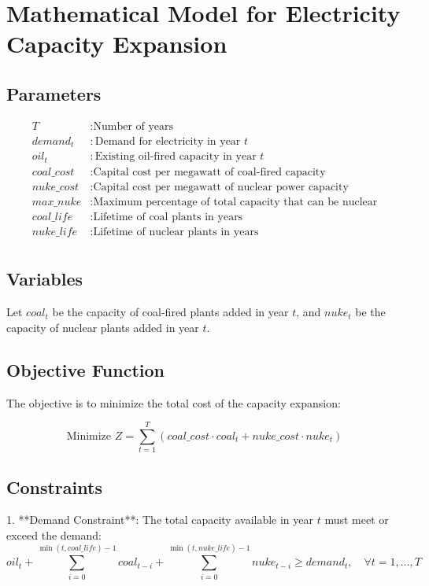 \documentclass{article}
\begin{document}
\section*{Mathematical Model for Electricity Capacity Expansion}

\subsection*{Parameters}

\begin{align*}
T & : \text{Number of years} \\
demand_t & : \text{Demand for electricity in year } t \\
oil_t & : \text{Existing oil-fired capacity in year } t \\
coal\_cost & : \text{Capital cost per megawatt of coal-fired capacity} \\
nuke\_cost & : \text{Capital cost per megawatt of nuclear power capacity} \\
max\_nuke & : \text{Maximum percentage of total capacity that can be nuclear} \\
coal\_life & : \text{Lifetime of coal plants in years} \\
nuke\_life & : \text{Lifetime of nuclear plants in years} \\
\end{align*}

\subsection*{Variables}

Let \( coal_t \) be the capacity of coal-fired plants added in year \( t \), and \( nuke_t \) be the capacity of nuclear plants added in year \( t \).

\subsection*{Objective Function}

The objective is to minimize the total cost of the capacity expansion:

\[
\text{Minimize } Z = \sum_{t=1}^{T} (coal\_cost \cdot coal_t + nuke\_cost \cdot nuke_t)
\]

\subsection*{Constraints}

1. **Demand Constraint**:
   The total capacity available in year \( t \) must meet or exceed the demand:
   \[
   oil_t + \sum_{i=0}^{\min(t, coal\_life)-1} coal_{t-i} + \sum_{i=0}^{\min(t, nuke\_life)-1} nuke_{t-i} \geq demand_t, \quad \forall t = 1, \ldots, T
   \]
\end{document}
